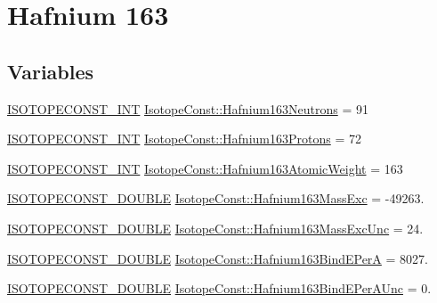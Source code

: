 \hypertarget{group___isotope_const-_hafnium-_hf163}{}\section{Hafnium 163}
\label{group___isotope_const-_hafnium-_hf163}
\subsection*{Variables}
\begin{DoxyCompactItemize}
\item 
\mbox{\hyperlink{group___isotope_const-_macros_ga5f18360b3e99483a35c32d789e62621c}{I\+S\+O\+T\+O\+P\+E\+C\+O\+N\+S\+T\+\_\+\+I\+NT}} \mbox{\hyperlink{group___isotope_const-_hafnium-_hf163_gae887470686627202cb1249ad69d8a42c}{Isotope\+Const\+::\+Hafnium163\+Neutrons}} = 91
\item 
\mbox{\hyperlink{group___isotope_const-_macros_ga5f18360b3e99483a35c32d789e62621c}{I\+S\+O\+T\+O\+P\+E\+C\+O\+N\+S\+T\+\_\+\+I\+NT}} \mbox{\hyperlink{group___isotope_const-_hafnium-_hf163_gaa3f0028984d12cf24ee5581e4bf155f1}{Isotope\+Const\+::\+Hafnium163\+Protons}} = 72
\item 
\mbox{\hyperlink{group___isotope_const-_macros_ga5f18360b3e99483a35c32d789e62621c}{I\+S\+O\+T\+O\+P\+E\+C\+O\+N\+S\+T\+\_\+\+I\+NT}} \mbox{\hyperlink{group___isotope_const-_hafnium-_hf163_gab0395efeda222aded7b8691a1c97d003}{Isotope\+Const\+::\+Hafnium163\+Atomic\+Weight}} = 163
\item 
\mbox{\hyperlink{group___isotope_const-_macros_ga8f45a7272ce02c0b4c65c44636ed719a}{I\+S\+O\+T\+O\+P\+E\+C\+O\+N\+S\+T\+\_\+\+D\+O\+U\+B\+LE}} \mbox{\hyperlink{group___isotope_const-_hafnium-_hf163_ga29f4aca909d0182c1aa2f19f8d70d20c}{Isotope\+Const\+::\+Hafnium163\+Mass\+Exc}} = -\/49263.
\item 
\mbox{\hyperlink{group___isotope_const-_macros_ga8f45a7272ce02c0b4c65c44636ed719a}{I\+S\+O\+T\+O\+P\+E\+C\+O\+N\+S\+T\+\_\+\+D\+O\+U\+B\+LE}} \mbox{\hyperlink{group___isotope_const-_hafnium-_hf163_ga57923d070bc9f11eab1703ee57645c7c}{Isotope\+Const\+::\+Hafnium163\+Mass\+Exc\+Unc}} = 24.
\item 
\mbox{\hyperlink{group___isotope_const-_macros_ga8f45a7272ce02c0b4c65c44636ed719a}{I\+S\+O\+T\+O\+P\+E\+C\+O\+N\+S\+T\+\_\+\+D\+O\+U\+B\+LE}} \mbox{\hyperlink{group___isotope_const-_hafnium-_hf163_ga82a85c514c22ae602f97b22e7be59585}{Isotope\+Const\+::\+Hafnium163\+Bind\+E\+PerA}} = 8027.
\item 
\mbox{\hyperlink{group___isotope_const-_macros_ga8f45a7272ce02c0b4c65c44636ed719a}{I\+S\+O\+T\+O\+P\+E\+C\+O\+N\+S\+T\+\_\+\+D\+O\+U\+B\+LE}} \mbox{\hyperlink{group___isotope_const-_hafnium-_hf163_gaa62ba05d728ea10881996a2cc1f48c7d}{Isotope\+Const\+::\+Hafnium163\+Bind\+E\+Per\+A\+Unc}} = 0.

\end{DoxyCompactItemize}
